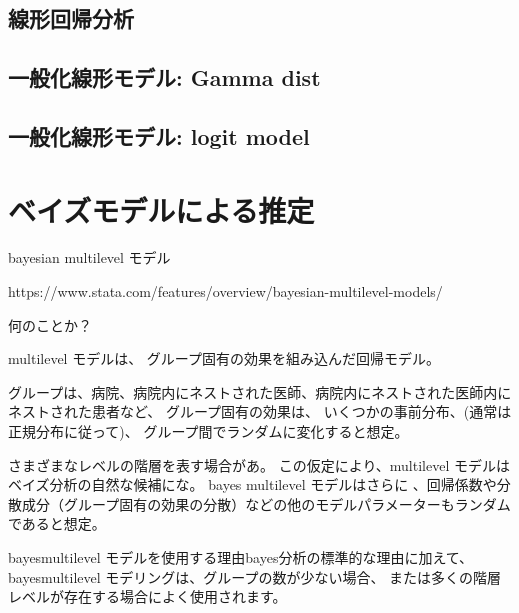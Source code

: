 \documentclass[a4j,11pt,mc]{jreport}
\begin{document}
	\section{線形回帰分析}






	\section{一般化線形モデル: Gamma dist}


	\section{一般化線形モデル: logit model}

\chapter{ベイズモデルによる推定}\label{chapter:bayes}

	bayesian multilevel モデル

	https://www.stata.com/features/overview/bayesian-multilevel-models/

	何のことか？

	multilevel モデルは、
	グループ固有の効果を組み込んだ回帰モデル。

	グループは、病院、病院内にネストされた医師、病院内にネストされた医師内にネストされた患者など、
	グループ固有の効果は、
	いくつかの事前分布、(通常は正規分布に従って)、
	グループ間でランダムに変化すると想定。


	さまざまなレベルの階層を表す場合があ。
	この仮定により、multilevel モデルはベイズ分析の自然な候補にな。
	bayes multilevel モデルはさらに
	、回帰係数や分散成分（グループ固有の効果の分散）などの他のモデルパラメーターもランダムであると想定。


	bayesmultilevel モデルを使用する理由bayes分析の標準的な理由に加えて、
	bayesmultilevel モデリングは、グループの数が少ない場合、
	または多くの階層レベルが存在する場合によく使用されます。
\end{document}
